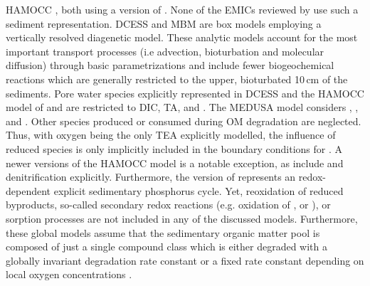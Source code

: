 \documentclass[gmd, manuscript]{copernicus}
\begin{document}
HAMOCC \citep{palastanga_long_term_2011, ilyina_global_2013}, both using a version of \citet{heinze_global_1999}. None of the EMICs reviewed by \citet{hulse_understanding_2017} use such a sediment representation. 
DCESS \citep{shaffer_presentation_2008} and MBM \citep{munhoven_glacialinterglacial_2007} are box models employing a vertically resolved diagenetic model. These analytic models account for the most important transport processes 
(i.e advection, bioturbation and molecular diffusion) through basic parametrizations and include fewer biogeochemical reactions which are generally restricted to the upper, bioturbated 10\,cm of the sediments. 
Pore water species explicitly represented in DCESS \citep{shaffer_presentation_2008} and the HAMOCC model of \citet{heinze_global_1999} and \citet{palastanga_long_term_2011} 
are restricted to DIC, TA,  and . The MEDUSA model \citep{munhoven_glacialinterglacial_2007} considers , ,  and . 
Other species produced or consumed during OM degradation are neglected. 
Thus, with oxygen being the only TEA explicitly modelled, the influence of reduced species is only implicitly included in the boundary conditions for . 
A newer versions of the HAMOCC model is a notable exception, as \citet{ilyina_global_2013} include  and denitrification explicitly. Furthermore, the version of 
\citet{palastanga_long_term_2011} represents an redox-dependent explicit sedimentary phosphorus cycle. Yet, reoxidation of reduced byproducts, so-called secondary redox reactions (e.g. oxidation of ,  or ), 
or sorption processes are not included in any of the discussed models. 
Furthermore, these global models assume that the sedimentary organic matter pool is composed of just a single compound class which is either degraded with a globally invariant degradation rate constant 
\citep[][]{munhoven_glacialinterglacial_2007} or a fixed rate constant depending on local oxygen concentrations \citep{shaffer_presentation_2008, palastanga_long_term_2011}. 


\end{document}
